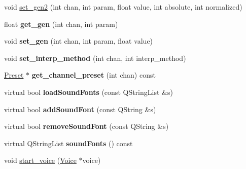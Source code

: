 \begin{DoxyCompactItemize}
\item 
void \hyperlink{class_fluid_s_1_1_fluid_a244d9c59f3fb961424d020c0dc666b7f}{set\+\_\+gen2} (int chan, int param, float value, int absolute, int normalized)
\item 
\mbox{\label{class_fluid_s_1_1_fluid_a1817eac37d9a715807ca3a8bf987e634}} 
float {\bfseries get\+\_\+gen} (int chan, int param)
\item 
\mbox{\label{class_fluid_s_1_1_fluid_a04719a83a9bf2567188d6fa8e0d1a016}} 
void {\bfseries set\+\_\+gen} (int chan, int param, float value)
\item 
\mbox{\label{class_fluid_s_1_1_fluid_a2729f60affee768d2032c632442da0e9}} 
void {\bfseries set\+\_\+interp\+\_\+method} (int chan, int interp\+\_\+method)
\item 
\mbox{\label{class_fluid_s_1_1_fluid_a3104d529d5acf3003d575388641e3aca}} 
\hyperlink{class_fluid_s_1_1_preset}{Preset} $\ast$ {\bfseries get\+\_\+channel\+\_\+preset} (int chan) const
\item 
\mbox{\label{class_fluid_s_1_1_fluid_ace56dfc62dcc4392fc929c9402310926}} 
virtual bool {\bfseries load\+Sound\+Fonts} (const Q\+String\+List \&s)
\item 
\mbox{\label{class_fluid_s_1_1_fluid_ab309bfbc656043f81f3ddae2e423c41d}} 
virtual bool {\bfseries add\+Sound\+Font} (const Q\+String \&s)
\item 
\mbox{\label{class_fluid_s_1_1_fluid_af0a11f64b5b5e93299a59bf710774214}} 
virtual bool {\bfseries remove\+Sound\+Font} (const Q\+String \&s)
\item 
\mbox{\label{class_fluid_s_1_1_fluid_ac5aa855bff8f0332163a80113dc1d9f2}} 
virtual Q\+String\+List {\bfseries sound\+Fonts} () const
\item 
void \hyperlink{class_fluid_s_1_1_fluid_a77103198aa6cb4a982178ac575fac1a7}{start\+\_\+voice} (\hyperlink{class_fluid_s_1_1_voice}{Voice} $\ast$voice)
\item 
\mbox{\label{class_fluid_s_1_1_fluid_a7737979cef99551a7223c3d620736ca6}} 

\end{DoxyCompactItemize}
